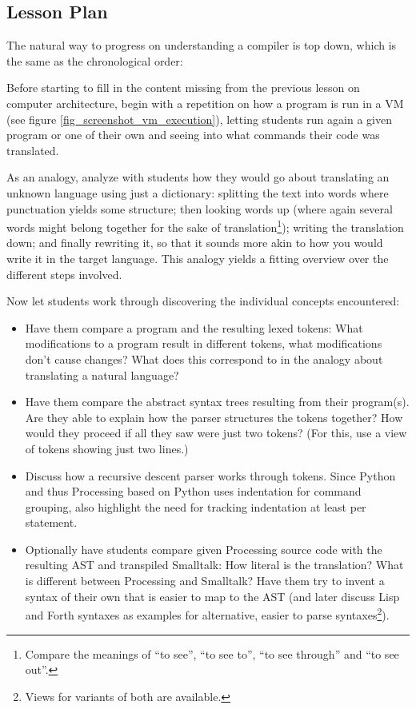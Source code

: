 \subsection{Lesson Plan}

The natural way to progress on understanding a compiler is top down, which is the same as the chronological order:

\begin{instructions}
\item Before starting to fill in the content missing from the previous lesson on computer architecture, begin with a repetition on how a program is run in a \ac{VM} (see figure \ref{fig_screenshot_vm_execution}), letting students run again a given program or one of their own and seeing into what commands their code was translated.
\item As an analogy, analyze with students how they would go about translating an unknown language using just a dictionary: splitting the text into words where punctuation yields some structure; then looking words up (where again several words might belong together for the sake of translation\footnote{Compare \eg the meanings of ``to see'', ``to see to'', ``to see through'' and ``to see out''.}); writing the translation down; and finally rewriting it, so that it sounds more akin to how you would write it in the target language. This analogy yields a fitting overview over the different steps involved.
\item Now let students work through discovering the individual concepts encountered:
\begin{itemize}
\item Have them compare a program and the resulting lexed tokens: What modifications to a program result in different tokens, what modifications don't cause changes? What does this correspond to in the analogy about translating a natural language?
\item Have them compare the abstract syntax trees resulting from their program(s). Are they able to explain how the parser structures the tokens together? How would they proceed if all they saw were just two tokens? (For this, use a view of tokens showing just two lines.)
\item Discuss how a recursive descent parser works through tokens. Since Python and thus Processing based on Python uses indentation for command grouping, also highlight the need for tracking indentation at least per statement.
\item Optionally have students compare given Processing source code with the resulting \ac{AST} and transpiled Smalltalk: How literal is the translation? What is different between Processing and Smalltalk? Have them try to invent a syntax of their own that is easier to map to the \ac{AST} (and later discuss Lisp and Forth syntaxes as examples for alternative, easier to parse syntaxes\footnote{Views for variants of both are available.}).

\end{itemize}
\end{instructions}

